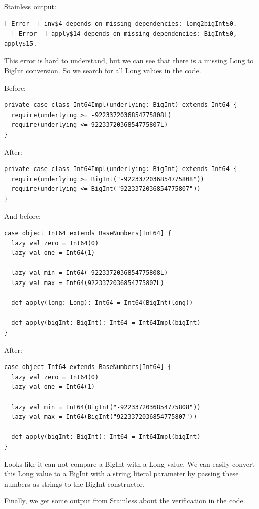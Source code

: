 \documentclass[runningheads]{llncs}
\begin{document}
Stainless output:
\begin{lstlisting}[style=stainless]
  [ Error  ] inv$4 depends on missing dependencies: long2bigInt$0.
  [ Error  ] apply$14 depends on missing dependencies: BigInt$0, apply$15.
\end{lstlisting}

This error is hard to understand, but we can see that there is a missing Long to BigInt conversion.
So we search for all Long values in the code.

Before:
\begin{lstlisting}[style=scala]
private case class Int64Impl(underlying: BigInt) extends Int64 {
  require(underlying >= -9223372036854775808L)
  require(underlying <= 9223372036854775807L)
}
\end{lstlisting}

After:
\begin{lstlisting}[style=scala]
private case class Int64Impl(underlying: BigInt) extends Int64 {
  require(underlying >= BigInt("-9223372036854775808"))
  require(underlying <= BigInt("9223372036854775807"))
}  
\end{lstlisting}

And before:
\begin{lstlisting}[style=scala]
case object Int64 extends BaseNumbers[Int64] {
  lazy val zero = Int64(0)
  lazy val one = Int64(1)

  lazy val min = Int64(-9223372036854775808L)
  lazy val max = Int64(9223372036854775807L)

  def apply(long: Long): Int64 = Int64(BigInt(long))

  def apply(bigInt: BigInt): Int64 = Int64Impl(bigInt)
}
\end{lstlisting}

After:
\begin{lstlisting}[style=scala]
case object Int64 extends BaseNumbers[Int64] {
  lazy val zero = Int64(0)
  lazy val one = Int64(1)

  lazy val min = Int64(BigInt("-9223372036854775808"))
  lazy val max = Int64(BigInt("9223372036854775807"))

  def apply(bigInt: BigInt): Int64 = Int64Impl(bigInt)
}
\end{lstlisting}

Looks like it can not compare a BigInt with a Long value.
We can easily convert this Long value to a BigInt with a string literal parameter by passing these numbers as strings to the BigInt constructor.

Finally, we get some output from Stainless about the verification in the code.
\end{document}

